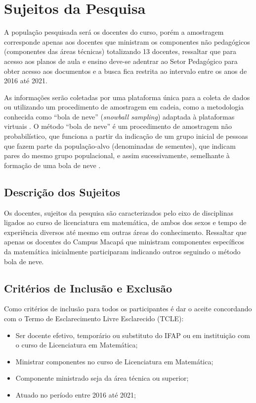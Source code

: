 \section{Sujeitos da Pesquisa}
\label{sujeitos_pesquisa}

A população pesquisada será os docentes do curso, porém a amostragem corresponde apenas aos docentes que ministram os componentes não pedagógicos (componentes das áreas técnicas) totalizando 13 docentes, ressaltar que para acesso aos planos de aula e ensino deve-se adentrar ao Setor Pedagógico para obter acesso aos documentos e a busca fica restrita ao intervalo entre os anos de 2016 até 2021.


As informações serão coletadas por uma plataforma única para a coleta de dados ou utilizando um procedimento de amostragem em cadeia, como a metodologia conhecida como “bola de neve” (\textit{snowball sampling}) adaptada à plataformas virtuais \cite{szwarcwald2021convid}. O método “bola de neve” é um procedimento de amostragem não probabilístico, que funciona a partir da indicação de um grupo inicial de pessoas que fazem parte da população-alvo (denominadas de sementes), que indicam pares do mesmo grupo populacional, e assim sucessivamente, semelhante à formação de uma bola de neve \cite{szwarcwald2021convid}.





\subsection{Descrição dos Sujeitos}
\label{descricao_sujeitos}

Os docentes, sujeitos da pesquisa são caracterizados pelo eixo de disciplinas ligados ao curso de licenciatura em matemática, de ambos dos sexos e tempo de experiência diversos até mesmo em outras áreas do conhecimento. Ressaltar que apenas os docentes do Campus Macapá que ministram componentes específicos da matemática inicialmente participaram indicando outros seguindo o método bola de neve.








\subsection{Critérios de Inclusão e Exclusão}
\label{criterios_sujeitos}

Como critérios de inclusão para todos os participantes  é dar o aceite concordando com o Termo de Esclarecimento Livre Esclarecido (TCLE):
\begin{itemize}
    \item Ser docente efetivo, temporário ou substituto do IFAP ou em instituição com o curso de Licenciatura em Matemática;
    \item Ministrar componentes no curso de Licenciatura em Matemática;
    \item Componente ministrado seja da área técnica ou superior;
    \item Atuado no período entre 2016 até 2021;
\end{itemize}




